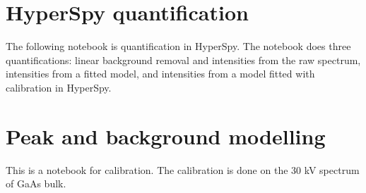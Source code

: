\chapter{HyperSpy quantification}
\label{appendix:HSquant}

The following notebook is quantification in HyperSpy.
The notebook does three quantifications: linear background removal and intensities from the raw spectrum, intensities from a fitted model, and intensities from a model fitted with calibration in HyperSpy.





\chapter{Peak and background modelling}
\label{appendix:modelling}

This is a notebook for calibration.
The calibration is done on the 30 kV spectrum of GaAs bulk.






